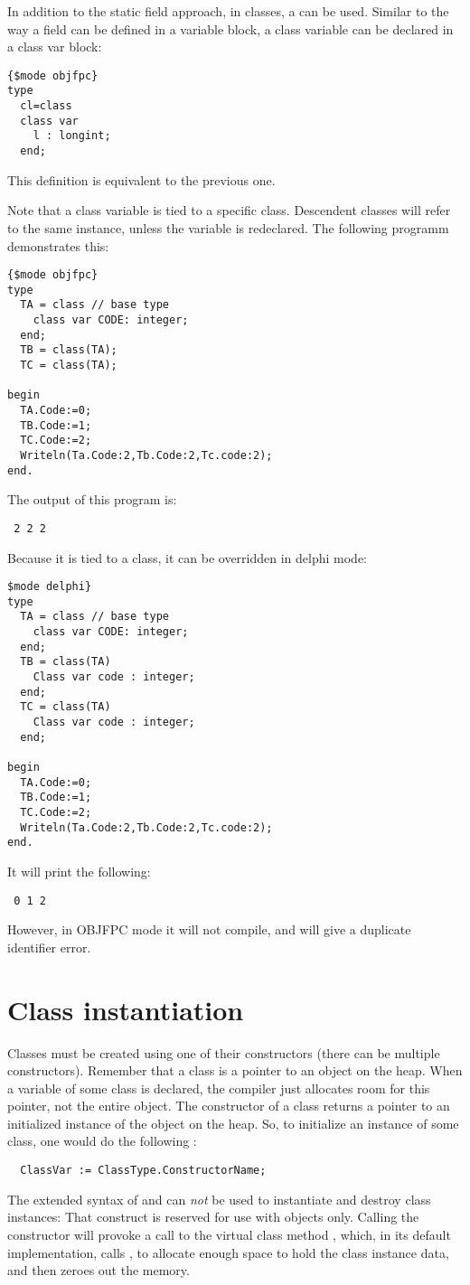 In addition to the static field approach, in classes, a  can be used. 
Similar to the way a field can be defined in a variable block, a class variable can
be declared in a class var block:
\begin{verbatim}
{$mode objfpc}
type
  cl=class
  class var 
    l : longint;
  end;
\end{verbatim}
This definition is equivalent to the previous one.

Note that a class variable is tied to a specific class. Descendent classes
will refer to the same instance, unless the variable is redeclared. 
The following programm demonstrates this:
\begin{verbatim}
{$mode objfpc}
type
  TA = class // base type
    class var CODE: integer;
  end;
  TB = class(TA); 
  TC = class(TA);

begin
  TA.Code:=0;
  TB.Code:=1;
  TC.Code:=2;
  Writeln(Ta.Code:2,Tb.Code:2,Tc.code:2);
end.
\end{verbatim}
The output of this program is:
\begin{verbatim}
 2 2 2
\end{verbatim}
Because it is tied to a class, it can be overridden in delphi mode:
\begin{verbatim}
$mode delphi}
type
  TA = class // base type
    class var CODE: integer;
  end;
  TB = class(TA)
    Class var code : integer;
  end; 
  TC = class(TA)
    Class var code : integer;
  end;

begin
  TA.Code:=0;
  TB.Code:=1;
  TC.Code:=2;
  Writeln(Ta.Code:2,Tb.Code:2,Tc.code:2);
end.
\end{verbatim}
It will print the following:
\begin{verbatim}
 0 1 2
\end{verbatim}
However, in OBJFPC mode it will not compile, and will give a duplicate
identifier error.

\section{Class instantiation}
\label{se:classinstantiation}
Classes must be created using one of their constructors (there can be
multiple constructors). Remember that a class is a pointer to an object on
the heap. When a variable of some class is declared, the compiler just 
allocates room for this pointer, not the entire object. The constructor of
a class returns a pointer to an initialized instance of the object on the
heap. So, to initialize an instance of some class, one would do the following :
\begin{verbatim}
  ClassVar := ClassType.ConstructorName;
\end{verbatim}
The extended syntax of  and  can {\em not} be used to
instantiate and destroy class instances:
That construct is reserved for use with objects only.
Calling the constructor will provoke a call to the virtual class method
, which, in its default implementation, calls , to allocate
enough space to hold the class instance data, and then zeroes out the memory.

